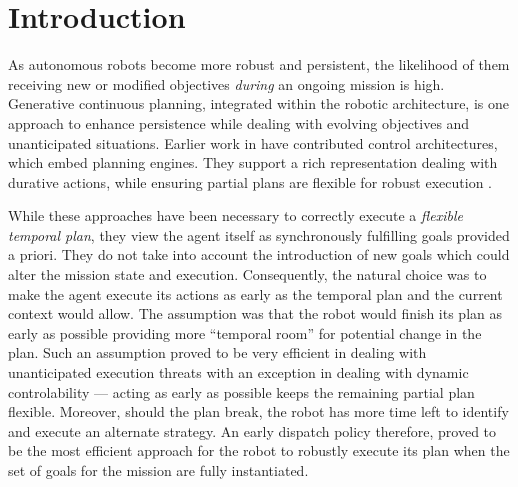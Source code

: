 \section{Introduction}
\label{sec:intro}

As autonomous robots become more robust and persistent, the likelihood
of them receiving new or modified objectives \emph{during} an ongoing
mission is high. Generative continuous planning, integrated within the
robotic architecture, is one approach to enhance persistence while
dealing with evolving objectives and unanticipated situations.
Earlier work in
\cite{AmbrosIngerson88,Haigh98,alami:1998p820,mus98,chien99,mus04,py10}
have contributed control architectures, which embed planning engines.
They support a rich representation dealing with durative actions,
while ensuring partial plans are flexible for robust execution
\cite{lemai-chenevier2004}.


While these approaches have been necessary to correctly execute a
\emph{flexible temporal plan}, they view the agent itself as
synchronously fulfilling goals provided a priori. They do not take
into account the introduction of new goals which could alter the
mission state and execution.
Consequently, the natural choice was to make the agent execute its
actions as early as the temporal plan and the current context would
allow. The assumption was that the robot would finish its plan as
early as possible providing more ``temporal room'' for potential
change in the plan. Such an assumption proved to be very efficient in
dealing with unanticipated execution threats with an exception in
dealing with dynamic controlability \cite{morris01} --- acting as
early as possible keeps the remaining partial plan flexible. Moreover,
should the plan break, the robot has more time left to identify and
execute an alternate strategy. An early dispatch policy therefore,
proved to be the most efficient approach for the robot to robustly
execute its plan when the set of goals for the mission are fully
instantiated.

